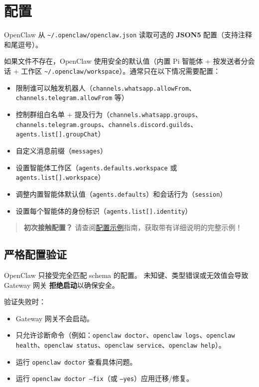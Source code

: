 \clearpage

\section{配置}


OpenClaw 从 \texttt{\textasciitilde{}/.openclaw/openclaw.json} 读取可选的 \textbf{JSON5} 配置（支持注释和尾逗号）。

如果文件不存在，OpenClaw 使用安全的默认值（内置 Pi 智能体 + 按发送者分会话 + 工作区 \texttt{\textasciitilde{}/.openclaw/workspace}）。通常只在以下情况需要配置：

\begin{itemize}
  \item 限制谁可以触发机器人（\texttt{channels.whatsapp.allowFrom}、\texttt{channels.telegram.allowFrom} 等）
  \item 控制群组白名单 + 提及行为（\texttt{channels.whatsapp.groups}、\texttt{channels.telegram.groups}、\texttt{channels.discord.guilds}、\texttt{agents.list[].groupChat}）
  \item 自定义消息前缀（\texttt{messages}）
  \item 设置智能体工作区（\texttt{agents.defaults.workspace} 或 \texttt{agents.list[].workspace}）
  \item 调整内置智能体默认值（\texttt{agents.defaults}）和会话行为（\texttt{session}）
  \item 设置每个智能体的身份标识（\texttt{agents.list[].identity}）
\end{itemize}


\begin{quote}
\textbf{初次接触配置？} 请查阅\href{/gateway/configuration-examples}{配置示例}指南，获取带有详细说明的完整示例！
\end{quote}


\subsection{严格配置验证}


OpenClaw 只接受完全匹配 schema 的配置。
未知键、类型错误或无效值会导致 Gateway 网关 \textbf{拒绝启动}以确保安全。

验证失败时：

\begin{itemize}
  \item Gateway 网关不会启动。
  \item 只允许诊断命令（例如：\texttt{openclaw doctor}、\texttt{openclaw logs}、\texttt{openclaw health}、\texttt{openclaw status}、\texttt{openclaw service}、\texttt{openclaw help}）。
  \item 运行 \texttt{openclaw doctor} 查看具体问题。
  \item 运行 \texttt{openclaw doctor --fix}（或 \texttt{--yes}）应用迁移/修复。
\end{itemize}



